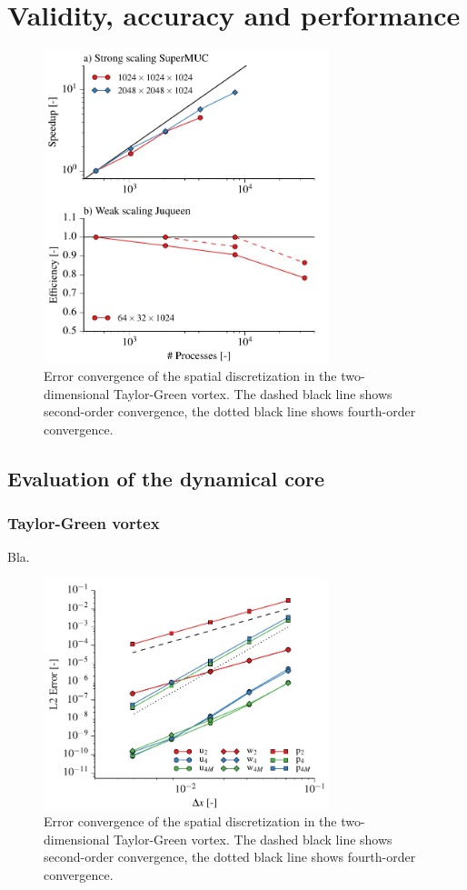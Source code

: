 \documentclass[gmd]{copernicus}
\begin{document}
\section{Validity, accuracy and performance} \label{sec:tests}
\begin{figure}[t]
\vspace*{2mm}
\begin{center}
\includegraphics[width=8.3cm]{figs/scaling.pdf}
\end{center}
\caption{Error convergence of the spatial discretization in the two-dimensional Taylor-Green vortex. The dashed black line shows second-order convergence, the dotted black line shows fourth-order convergence.}
\end{figure}
\subsection{Evaluation of the dynamical core}
\subsubsection{Taylor-Green vortex}
Bla.
\begin{figure}[t]
\vspace*{2mm}
\begin{center}
\includegraphics[width=8.3cm]{figs/taylorgreen.pdf}
\end{center}
\caption{Error convergence of the spatial discretization in the two-dimensional Taylor-Green vortex. The dashed black line shows second-order convergence, the dotted black line shows fourth-order convergence.}
\end{figure}
\end{document}
